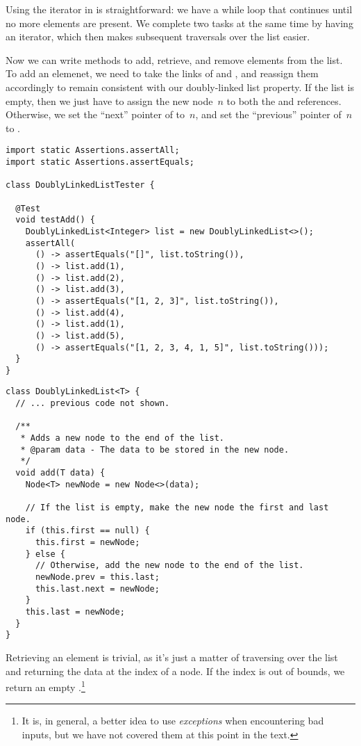 Using the iterator in  is straightforward: we have a while loop that continues until no more elements are present. We complete two tasks at the same time by having an iterator, which then makes subsequent traversals over the list easier.

Now we can write methods to add, retrieve, and remove elements from the list. To add an elemenet, we need to take the links of  and , and reassign them accordingly to remain consistent with our doubly-linked list property. If the list is empty, then we just have to assign the new node~$n$ to both the  and  references. Otherwise, we set the ``next'' pointer of  to~$n$, and set the ``previous'' pointer of~$n$ to . 

\enlargethispage{-3\baselineskip}
\begin{lstlisting}[language=MyJava]
import static Assertions.assertAll;
import static Assertions.assertEquals;

class DoublyLinkedListTester {

  @Test
  void testAdd() {
    DoublyLinkedList<Integer> list = new DoublyLinkedList<>();
    assertAll(
      () -> assertEquals("[]", list.toString()),
      () -> list.add(1),
      () -> list.add(2),
      () -> list.add(3),
      () -> assertEquals("[1, 2, 3]", list.toString()),
      () -> list.add(4),
      () -> list.add(1),
      () -> list.add(5),
      () -> assertEquals("[1, 2, 3, 4, 1, 5]", list.toString()));
  }
}
\end{lstlisting}

\begin{lstlisting}[language=MyJava]
class DoublyLinkedList<T> {
  // ... previous code not shown.

  /**
   * Adds a new node to the end of the list.
   * @param data - The data to be stored in the new node.
   */
  void add(T data) {
    Node<T> newNode = new Node<>(data);

    // If the list is empty, make the new node the first and last node.
    if (this.first == null) {
      this.first = newNode;
    } else {
      // Otherwise, add the new node to the end of the list.
      newNode.prev = this.last;
      this.last.next = newNode;
    }
    this.last = newNode;
  }
}
\end{lstlisting}

Retrieving an element is trivial, as it's just a matter of traversing over the list and returning the data at the index of a node. If the index is out of bounds, we return an empty .\footnote{It is, in general, a better idea to use \emph{exceptions} when encountering bad inputs, but we have not covered them at this point in the text.}

